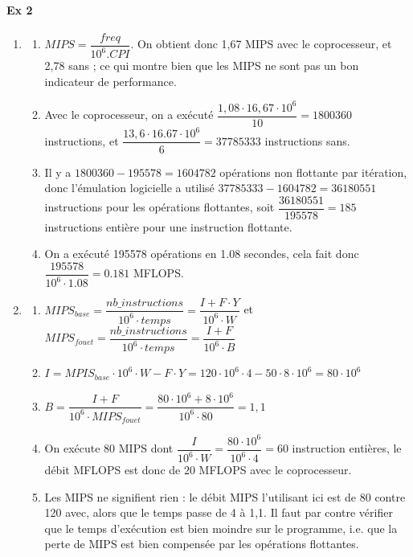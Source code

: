 \documentclass{article}
\begin{document}
\paragraph{Ex 2}
\begin{enumerate}
\item
\begin{enumerate}
\item $MIPS = \dfrac{freq}{10^6 . CPI}$. On obtient donc 1,67 MIPS avec le coprocesseur, et 2,78 sans ; ce qui montre bien que les MIPS ne sont pas un bon indicateur de performance.

\item Avec le coprocesseur, on a exécuté $\dfrac{1,08 \cdot 16,67 \cdot 10^6}{10} = 1800360$ instructions, et $\dfrac{13,6\cdot 16.67 \cdot 10^6}{6} = 37785333$ instructions sans.

\item Il y a $1800360-195578 = 1604782$ opérations non flottante par itération, donc l'émulation logicielle a utilisé $37785333-1604782 = 36180551$ instructions pour les opérations flottantes, soit $\dfrac{36180551}{195578} = 185$ instructions entière pour une instruction flottante.
\item On a exécuté 195578 opérations en 1.08 secondes, cela fait donc $\dfrac{195578}{10^6 \cdot 1.08} = 0.181$ MFLOPS.
\end{enumerate}

\item
\begin{enumerate}
\item $MIPS_{base} = \dfrac{nb\_instructions}{10^6 \cdot temps} = \dfrac{I + F\cdot Y}{10^6 \cdot W}$ et $MIPS_{fouet} =  \dfrac{nb\_instructions}{10^6 \cdot temps} = \dfrac{I + F}{10^6 \cdot B}$
\item $I = MPIS_{base}\cdot 10^6 \cdot W - F\cdot Y = 120 \cdot 10^6 \cdot 4 - 50 \cdot 8 \cdot 10^6 = 80\cdot 10 ^6$
\item $B = \dfrac{I+F}{10^6\cdot MIPS_{fouet}} = \dfrac{80\cdot 10^6 + 8\cdot 10 ^6}{10^6 \cdot 80} = 1,1$
\item On exécute $80$ MIPS dont $\dfrac{I}{10^6 \cdot W} = \dfrac{80 \cdot 10 ^6}{10^6 \cdot 4} = 60$ instruction entières, le débit MFLOPS est donc de $20$ MFLOPS avec le coprocesseur.
\item Les MIPS ne signifient rien : le débit MIPS l'utilisant ici est de 80 contre 120 avec, alors que le temps passe de 4 à 1,1. Il faut par contre vérifier que le temps d'exécution est bien moindre sur le programme, i.e. que la perte de MIPS est bien compensée par les opérations flottantes.
\end{enumerate}
\end{enumerate}
\end{document}
